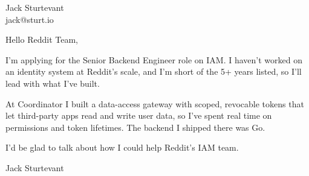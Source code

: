 \documentclass[11pt]{article}
\begin{document}
\raggedright

{\namefont\fontsize{20pt}{24pt}\selectfont Jack Sturtevant}\\[-0.3em]
jack@sturt.io

\vspace{1.2em}

Hello Reddit Team,

I'm applying for the Senior Backend Engineer role on IAM. I haven't worked on an identity system at Reddit's scale, and I'm short of the 5+ years listed, so I'll lead with what I've built.

At Coordinator I built a data-access gateway with scoped, revocable tokens that let third-party apps read and write user data, so I've spent real time on permissions and token lifetimes. The backend I shipped there was Go.

I'd be glad to talk about how I could help Reddit's IAM team.

\vspace{0.6em}
Jack Sturtevant
\end{document}
